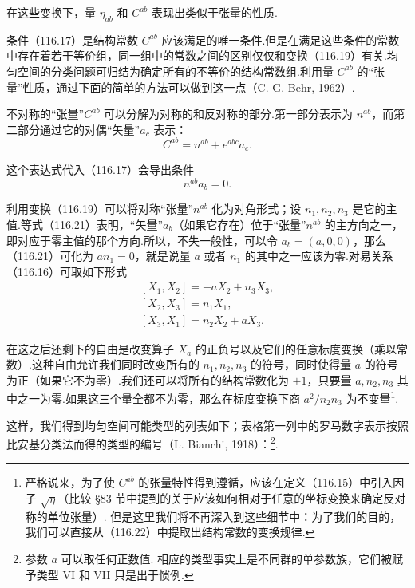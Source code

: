 在这些变换下，量 $\eta_{ab}$ 和 $C^{ab}$ 表现出类似于张量的性质.

条件（116.17）是结构常数 $C^{ab}$ 应该满足的唯一条件.但是在满足这些条件的常数中存在着若干等价组，同一组中的常数之间的区别仅仅和变换（116.19）有关.均匀空间的分类问题可归结为确定所有的不等价的结构常数组.利用量 $C^{ab}$ 的“张量”性质，通过下面的简单的方法可以做到这一点（C. G. Behr, 1962）.

不对称的“张量”$C^{ab}$ 可以分解为对称的和反对称的部分.第一部分表示为 $n^{ab}$，而第二部分通过它的对偶“矢量”$a_{c}$ 表示：
\begin{equation}
  C^{ab}=n^{ab}+e^{abc}a_{c}.
\end{equation}

这个表达式代入（116.17）会导出条件
\begin{equation}
  n^{ab}a_{b}=0.
\end{equation}

利用变换（116.19）可以将对称“张量”$n^{ab}$ 化为对角形式；设 $n_{1},n_{2},n_{3}$ 是它的主值.等式（116.21）表明，“矢量”$a_{b}$（如果它存在）位于“张量”$n^{ab}$ 的主方向之一，即对应于零主值的那个方向.所以，不失一般性，可以令 $a_{b}=(a,0,0)$，那么（116.21）可化为 $an_{1}=0$，就是说量 $a$ 或者 $n_{1}$ 的其中之一应该为零.对易关系（116.16）可取如下形式
\begin{equation}
  \begin{gathered}
    [X_{1},X_{2}]=-aX_{2}+n_{3}X_{3},\\
    [X_{2},X_{3}]=n_{1}X_{1},\\
    [X_{3},X_{1}]=n_{2}X_{2}+aX_{3}.
  \end{gathered}
\end{equation}

在这之后还剩下的自由是改变算子 $X_{a}$ 的正负号以及它们的任意标度变换（乘以常数）.这种自由允许我们同时改变所有的 $n_{1},n_{2},n_{3}$ 的符号，同时使得量 $a$ 的符号为正（如果它不为零）.我们还可以将所有的结构常数化为 $\pm1$，只要量 $a,n_{2},n_{3}$ 其中之一为零.如果这三个量全都不为零，那么在标度变换下商 $a^{2}/n_{2}n_{3}$ 为不变量\footnote{严格说来，为了使 $C^{ab}$ 的张量特性得到遵循，应该在定义（116.15）中引入因子 $\sqrt{\eta}$（比较 §83 节中提到的关于应该如何相对于任意的坐标变换来确定反对称的单位张量）. 但是这里我们将不再深入到这些细节中：为了我们的目的，我们可以直接从（116.22）中提取出结构常数的变换规律.}.

这样，我们得到均匀空间可能类型的列表如下；表格第一列中的罗马数字表示按照比安基分类法而得的类型的编号（L. Bianchi, 1918）：\footnote{参数 $a$ 可以取任何正数值. 相应的类型事实上是不同群的单参数族，它们被赋予类型 VI 和 VII 只是出于惯例.}.


